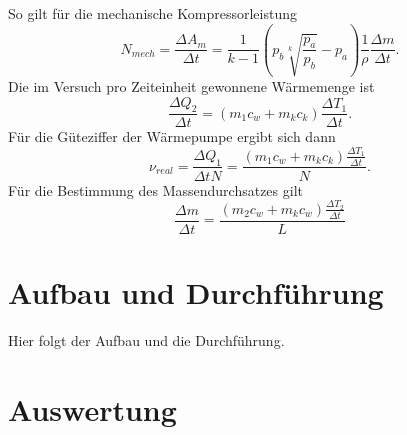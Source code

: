 \documentclass[11pt]{article}
\begin{document}
So gilt für die mechanische Kompressorleistung
\begin{equation}
\label{F7}
N_{mech} = \frac{\Delta A_m}{\Delta t} = \frac{1}{k-1} \left(p_b \sqrt[k]{\frac{p_a}{p_b}}-p_a \right) \frac{1}{\rho} \frac{\Delta m}{\Delta t}.
\end{equation}
Die im Versuch pro Zeiteinheit gewonnene Wärmemenge ist
\begin{equation}
\label{F8}
\frac{\Delta Q_2}{\Delta t} = (m_1c_w + m_kc_k) \frac{\Delta T_1}{\Delta t}.
\end{equation}
Für die Güteziffer der Wärmepumpe ergibt sich dann
\begin{equation}
\label{F9}
\nu_{real} = \frac{\Delta Q_1}{\Delta t N} = \frac{(m_1c_w + m_kc_k) \frac{\Delta T_1}{\Delta t}}{N}.
\end{equation}
Für die Bestimmung des Massendurchsatzes gilt
\begin{equation}
\label{F10}
\frac{\Delta m}{\Delta t} = \frac{(m_2 c_w + m_k c_w) \frac{\Delta T_2}{\Delta t}}{L}
\end{equation}

\section{Aufbau und Durchf\"{u}hrung}
Hier folgt der Aufbau und die Durchführung.
\section{Auswertung}
\end{document}
